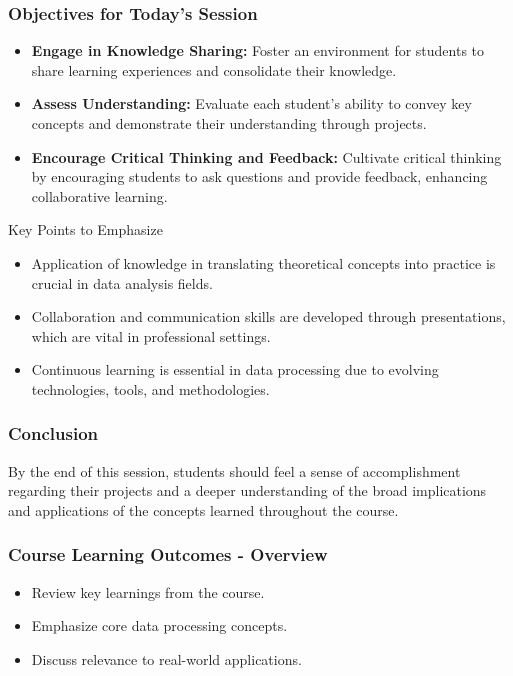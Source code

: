\documentclass[aspectratio=169]{beamer}
\begin{document}
\begin{frame}[fragile]
    \frametitle{Objectives for Today’s Session}
    \begin{itemize}
        \item \textbf{Engage in Knowledge Sharing:} Foster an environment for students to share learning experiences and consolidate their knowledge.
        
        \item \textbf{Assess Understanding:} Evaluate each student’s ability to convey key concepts and demonstrate their understanding through projects.
        
        \item \textbf{Encourage Critical Thinking and Feedback:} Cultivate critical thinking by encouraging students to ask questions and provide feedback, enhancing collaborative learning.
    \end{itemize}
    
    \begin{block}{Key Points to Emphasize}
        \begin{itemize}
            \item Application of knowledge in translating theoretical concepts into practice is crucial in data analysis fields.
            \item Collaboration and communication skills are developed through presentations, which are vital in professional settings.
            \item Continuous learning is essential in data processing due to evolving technologies, tools, and methodologies.
        \end{itemize}
    \end{block}
\end{frame}

\begin{frame}[fragile]
    \frametitle{Conclusion}
    By the end of this session, students should feel a sense of accomplishment regarding their projects and a deeper understanding of the broad implications and applications of the concepts learned throughout the course.
\end{frame}

\begin{frame}[fragile]
    \frametitle{Course Learning Outcomes - Overview}
    \begin{itemize}
        \item Review key learnings from the course.
        \item Emphasize core data processing concepts.
        \item Discuss relevance to real-world applications.
    \end{itemize}
\end{frame}
\end{document}
